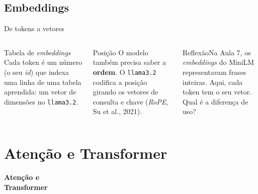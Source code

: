 \documentclass[aspectratio=169]{beamer}
\newcommand{\reflexao}[1]{\begin{alertblock}{Reflexão}#1\end{alertblock}}
\newcommand{\tk}[1]{{\setlength{\fboxsep}{1.6pt}\colorbox{mineblue!12}{\strut\ttfamily\footnotesize #1}}}
\begin{document}
\subsection{Embeddings}
\begin{frame}{De tokens a vetores}
    \begin{columns}
        \begin{block}{Tabela de \textit{embeddings}}
            \footnotesize Cada token é um número (o seu \textit{id}) que indexa uma linha de uma tabela aprendida: um vetor de \textbf{\vEMB} dimensões no \texttt{llama3.2}.
        \end{block}
        \pause
        \begin{block}{Posição}
            \footnotesize O modelo também precisa saber a \textbf{ordem}. O \texttt{llama3.2} codifica a posição girando os vetores de consulta e chave (\textit{RoPE}, Su et al., 2021).
        \end{block}
        \centering
        \reflexao{Na Aula 7, os \textit{embeddings} do MiniLM representavam frases inteiras. Aqui, cada token tem o seu vetor. Qual é a diferença de uso?}
    \end{columns}
\end{frame}

\section{Atenção e Transformer}
\begin{frame}
\centering\Huge\textbf{Atenção e\\Transformer}
\end{frame}
\end{document}
